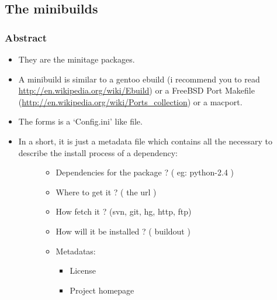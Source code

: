 \documentclass[letterpaper,10pt,english]{sphinxmanual}
\begin{document}
\subsection{The minibuilds}
\label{spec:the-minibuilds}

\subsubsection{Abstract}
\label{spec:id1}\begin{itemize}
\item {} 
They are the minitage packages.

\item {} 
A minibuild is similar to a gentoo ebuild  (i recommend you to read \href{http://en.wikipedia.org/wiki/Ebuild}{http://en.wikipedia.org/wiki/Ebuild}) or a FreeBSD Port Makefile (\href{http://en.wikipedia.org/wiki/Ports\_collection}{http://en.wikipedia.org/wiki/Ports\_collection})  or a macport.

\item {} 
The forms is a `Config.ini' like file.

\item {} \begin{description}
\item[{In a short, it is just a metadata file which contains all the necessary to describe the install process of a dependency:}] \leavevmode\begin{itemize}
\item {} 
Dependencies for the package ? ( eg: python-2.4 )

\item {} 
Where to get it ? ( the url )

\item {} 
How fetch it ? (svn, git, hg, http, ftp)

\item {} 
How will it be installed ? ( buildout )

\item {} 
Metadatas:
\begin{itemize}
\item {} 
License

\item {} 
Project homepage

\end{itemize}

\end{itemize}

\end{description}

\end{itemize}
\end{document}
